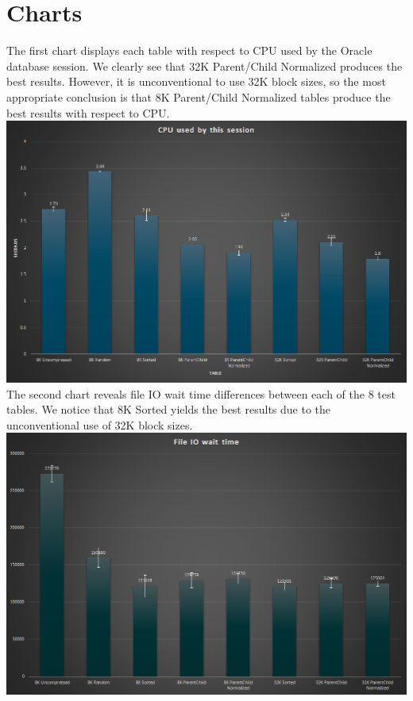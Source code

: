 \documentclass[10pt]{article}
\begin{document}
\section{Charts}
The first chart displays each table with respect to CPU used by the Oracle database session. We clearly see that 32K Parent/Child Normalized produces the best results. However, it is unconventional to use 32K block sizes, so the most appropriate conclusion is that 8K Parent/Child Normalized tables produce the best results with respect to CPU. \newline \newline
\includegraphics[scale=0.5]{cpu.png} \newline \newline
The second chart reveals file IO wait time differences between each of the 8 test tables. We notice that 8K Sorted yields the best results due to the unconventional use of 32K block sizes. \newline \newline
\includegraphics[scale=0.5]{file_io.png}
\end{document}
